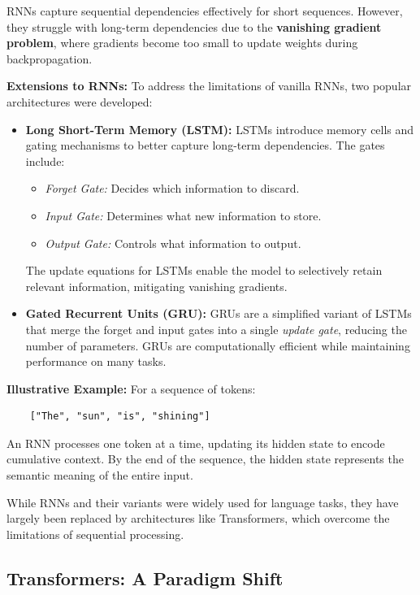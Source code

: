     RNNs capture sequential dependencies effectively for short sequences. However, they struggle with long-term dependencies due to the \textbf{vanishing gradient problem}, where gradients become too small to update weights during backpropagation. 

    \textbf{Extensions to RNNs:}
    To address the limitations of vanilla RNNs, two popular architectures were developed:
    \begin{itemize}
        \item \textbf{Long Short-Term Memory (LSTM):} LSTMs introduce memory cells and gating mechanisms to better capture long-term dependencies. The gates include:
        \begin{itemize}
            \item \textit{Forget Gate:} Decides which information to discard.
            \item \textit{Input Gate:} Determines what new information to store.
            \item \textit{Output Gate:} Controls what information to output.
        \end{itemize}
        The update equations for LSTMs enable the model to selectively retain relevant information, mitigating vanishing gradients.
        
        \item \textbf{Gated Recurrent Units (GRU):} GRUs are a simplified variant of LSTMs that merge the forget and input gates into a single \textit{update gate}, reducing the number of parameters. GRUs are computationally efficient while maintaining performance on many tasks.
    \end{itemize}

    \textbf{Illustrative Example:}
    For a sequence of tokens:
    \begin{verbatim}
    ["The", "sun", "is", "shining"]
    \end{verbatim}
    An RNN processes one token at a time, updating its hidden state to encode cumulative context. By the end of the sequence, the hidden state represents the semantic meaning of the entire input.

    While RNNs and their variants were widely used for language tasks, they have largely been replaced by architectures like Transformers, which overcome the limitations of sequential processing.


\subsection{Transformers: A Paradigm Shift}

